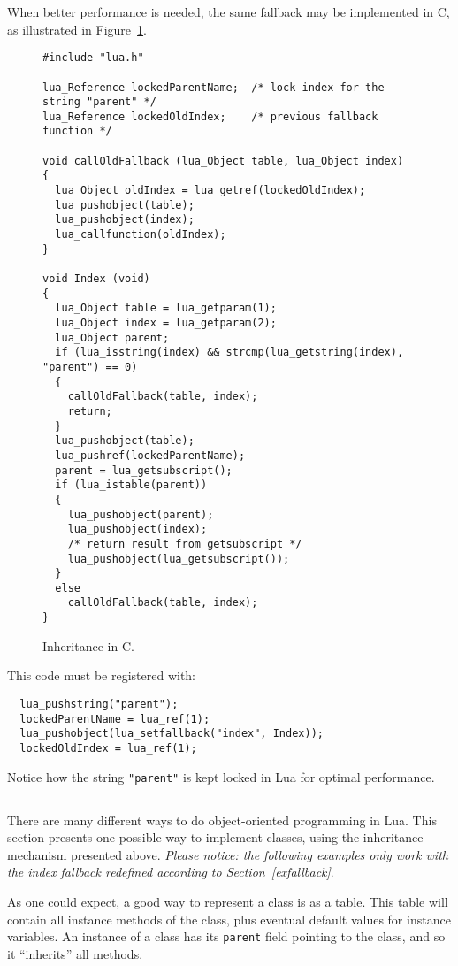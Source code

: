 When better performance is needed,
the same fallback may be implemented in C,
as illustrated in Figure~\ref{Cinher}.
\begin{figure}
\Line
\begin{verbatim}
#include "lua.h"

lua_Reference lockedParentName;  /* lock index for the string "parent" */
lua_Reference lockedOldIndex;    /* previous fallback function */

void callOldFallback (lua_Object table, lua_Object index)
{
  lua_Object oldIndex = lua_getref(lockedOldIndex);
  lua_pushobject(table);
  lua_pushobject(index);
  lua_callfunction(oldIndex);
}

void Index (void)
{
  lua_Object table = lua_getparam(1);
  lua_Object index = lua_getparam(2);
  lua_Object parent;
  if (lua_isstring(index) && strcmp(lua_getstring(index), "parent") == 0)
  {
    callOldFallback(table, index);
    return;
  }
  lua_pushobject(table);
  lua_pushref(lockedParentName);
  parent = lua_getsubscript();
  if (lua_istable(parent))
  {
    lua_pushobject(parent);
    lua_pushobject(index);
    /* return result from getsubscript */
    lua_pushobject(lua_getsubscript());
  }
  else
    callOldFallback(table, index);
}
\end{verbatim}
\caption{Inheritance in C.\label{Cinher}}
\Line
\end{figure}
This code must be registered with:
\begin{verbatim}
  lua_pushstring("parent");
  lockedParentName = lua_ref(1);
  lua_pushobject(lua_setfallback("index", Index));
  lockedOldIndex = lua_ref(1);
\end{verbatim}
Notice how the string \verb'"parent"' is kept
locked in Lua for optimal performance.

\subsection{}
There are many different ways to do object-oriented programming in Lua.
This section presents one possible way to
implement classes,
using the inheritance mechanism presented above.
{\em Please notice: the following examples only work
with the index fallback redefined according to
Section~\ref{exfallback}}.

As one could expect, a good way to represent a class is
as a table.
This table will contain all instance methods of the class,
plus eventual default values for instance variables.
An instance of a class has its \verb'parent' field pointing to
the class,
and so it ``inherits'' all methods.

